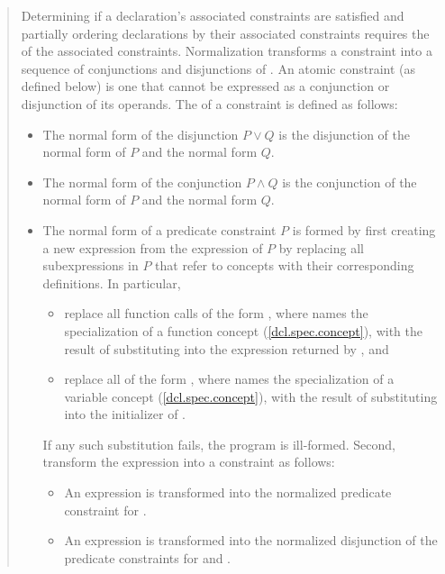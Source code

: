 \begin{quote}
\pnum
Determining if a declaration's associated constraints are satisfied
and partially ordering declarations by their associated constraints
requires the  of the associated constraints. 
% 
Normalization transforms a constraint into a
sequence of conjunctions and disjunctions of .
% 
An atomic constraint (as defined below) is one that cannot be expressed
as a conjunction or disjunction of its operands.
% 
The  of a constraint is defined as follows:
% 
\begin{itemize}
\item The normal form of the disjunction $P \lor Q$ is the 
disjunction of the normal form of $P$ and the normal form $Q$.

\item The normal form of the conjunction $P \land Q$ is the 
conjunction of the normal form of $P$ and the normal form $Q$.

\item The normal form of a predicate constraint $P$ is formed by
first creating a new expression  from the expression of $P$ by 
replacing all subexpressions in $P$ that refer to concepts with their 
corresponding definitions. In particular,
% 
\begin{itemize}

\item replace all function calls of the form 
, where  
names the specialization of a function concept  (\ref{dcl.spec.concept}),
with the result of substituting  into the 
expression returned by , and

\item replace all  of the form 
, where  
names the specialization of a variable concept  (\ref{dcl.spec.concept}),
with the result of substituting  
into the initializer of .
\end{itemize}
% 
If any such substitution fails, the program is ill-formed.
% 
Second, transform the expression  into a constraint as follows:
\begin{itemize}
\item An expression  is transformed into the normalized predicate 
constraint for .

\item An expression  is transformed into the normalized 
disjunction of the predicate constraints for  and .


\end{itemize}
\end{itemize}
\end{quote}
